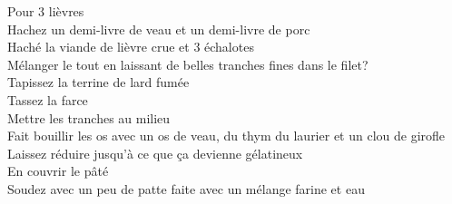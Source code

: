 \begin{minipage}[c]{\textwidth}

\end{minipage}

\begin{minipage}[c]{\textwidth}
Pour 3 lièvres\\
Hachez un demi-livre de veau et un demi-livre de porc\\
Haché la viande de lièvre crue et 3 échalotes\\
Mélanger le tout en laissant de belles tranches fines dans le filet?\\
Tapissez la terrine de lard fumée\\
Tassez la farce\\
Mettre les tranches au milieu\\
Fait bouillir les os avec un os de veau, du thym du laurier et un clou de girofle\\
Laissez réduire jusqu'à ce que ça devienne gélatineux\\
En couvrir le pâté\\
Soudez avec un peu de patte faite avec un mélange farine et eau\\
\\

\end{minipage}

